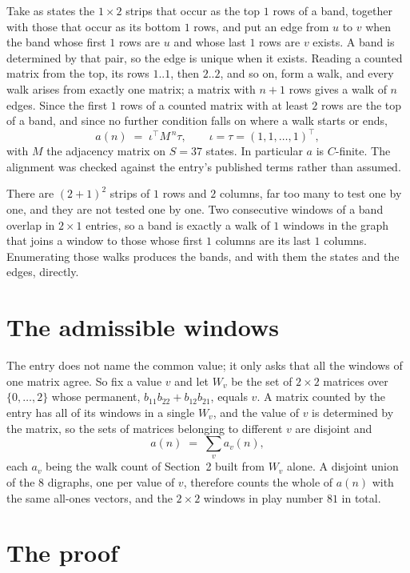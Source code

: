 \documentclass[11pt,a4paper]{article}
\theoremstyle{plain}
\theoremstyle{definition}
\begin{document}
Take as states the $1\times2$ strips that occur as the top $1$ rows of a band,
together with those that occur as its bottom $1$ rows, and put an edge from $u$ to $v$
when the band whose first $1$ rows are $u$ and whose last $1$ rows are $v$ exists.
A band is determined by that pair, so the edge is unique when it exists. Reading a counted
matrix from the top, its rows $1..1$, then $2..2$, and so on, form a walk, and every
walk arises from exactly one matrix; a matrix with $n+1$ rows gives a walk of $n$ edges.
Since the first $1$ rows of a counted matrix with at least $2$ rows are the top of a
band, and since no further condition falls on where a walk starts or ends,
\[
a(n)\;=\;\iota^{\!\top}M^{\,n}\tau ,\qquad \iota=\tau=(1,1,\dots,1)^{\!\top},
\]
with $M$ the adjacency matrix on $S=37$ states. In particular $a$ is $C$-finite. The
alignment was checked against the entry's published terms rather than assumed.

There are $(2 + 1)^{2}$ strips of $1$ rows and $2$ columns, far too
many to test one by one, and they are not tested one by one. Two consecutive windows of a band
overlap in $2\times1$ entries, so a band is exactly a walk of $1$ windows in
the graph that joins a window to those whose first $1$ columns are its last $1$
columns. Enumerating those walks produces the bands, and with them the states and the edges,
directly.

\section{The admissible windows}

The entry does not name the common value; it only asks that all the windows of one matrix agree.
So fix a value $v$ and let $W_v$ be the set of $2\times2$ matrices over
$\{0,\dots,2\}$ whose permanent, $b_{11}b_{22}+b_{12}b_{21}$, equals $v$. A matrix counted by the entry has all of
its windows in a single $W_v$, and the value of $v$ is determined by the matrix, so the sets of
matrices belonging to different $v$ are disjoint and
\[
a(n)\;=\;\sum_v a_v(n),
\]
each $a_v$ being the walk count of Section~2 built from $W_v$ alone. A disjoint union of the
$8$ digraphs, one per value of $v$, therefore counts the whole of $a(n)$ with the same
all-ones vectors, and the $2\times2$ windows in play number $81$ in total.

\section{The proof}
\end{document}
